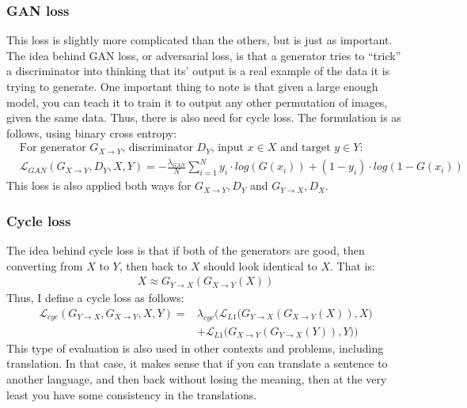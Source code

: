 \subsubsection{GAN loss}
This loss is slightly more complicated than the others, but is just as important. The idea behind GAN loss, or adversarial loss, is that a generator tries to ``trick'' a discriminator into thinking that its' output is a real example of the data it is trying to generate. One important thing to note is that given a large enough model, you can teach it to train it to output any other permutation of images, given the same data. Thus, there is also need for cycle loss. The formulation is as follows, using binary cross entropy:
\begin{align}
  &\text{For generator $G_{X\rightarrow Y}$, discriminator $D_Y$, input $x \in X$ and target $y \in Y$:} \nonumber\\
  &\mathcal{L}_{GAN}(G_{X\rightarrow Y},D_Y,X,Y) = -\frac{\lambda_{GAN}}{N} \sum_{i=1}^N y_i \cdot log\left(G(x_i)\right) + (1-y_i) \cdot log\left(1-G(x_i)\right)\label{eq:ganlambda}
\end{align}
This loss is also applied both ways for $G_{X\rightarrow Y}, D_Y$ and $G_{Y\rightarrow X}, D_X$.

\subsubsection{Cycle loss}
The idea behind cycle loss is that if both of the generators are good, then converting from $X$ to $Y$, then back to $X$ should look identical to $X$. That is:
\begin{align*}
  X \approx G_{Y\rightarrow X}(G_{X\rightarrow Y}(X))
\end{align*}
Thus, I define a cycle loss as follows:
\begin{align}
  \mathcal{L}_{cyc}(G_{Y\rightarrow X}, G_{X\rightarrow Y}, X, Y) =& \lambda_{cyc} \bigg(\mathcal{L}_{L1}\big( G_{Y\rightarrow X}(G_{X\rightarrow Y}(X)), X\big)\nonumber\\
  &+ \mathcal{L}_{L1}\big( G_{X\rightarrow Y}(G_{Y\rightarrow X}(Y)), Y\big)\bigg)\label{eq:cyclambda}
\end{align}
This type of evaluation is also used in other contexts and problems, including translation. In that case, it makes sense that if you can translate a sentence to another language, and then back without losing the meaning, then at the very least you have some consistency in the translations.
